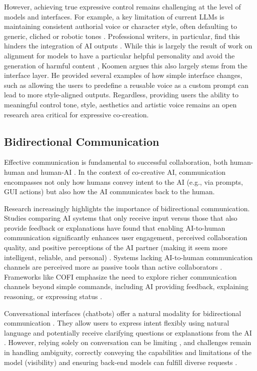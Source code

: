 However, achieving true expressive control remains challenging at the level of models and interfaces. For example, a key limitation of current LLMs is maintaining consistent authorial voice or character style, often defaulting to generic, cliched or robotic tones \cite{Ippolito2022-mf, Yuan2022-kb, Chakrabarty2024-ov}. Professional writers, in particular, find this hinders the integration of AI outputs \cite{Ippolito2022-mf, Grigis2024-pf}. While this is largely the result of work on alignment for models to have a particular helpful personality and avoid the generation of harmful content \cite{Anthropic2024-ne, Ouyang2022-af, Bai2022-ec}, Koomen \cite{Koomen2025-eu} argues this also largely stems from the interface layer. He provided several examples of how simple interface changes, such as allowing the users to predefine a reusable voice as a custom prompt can lead to more style-aligned outputs. Regardless, providing users the ability to meaningful control tone, style, aesthetics and artistic voice remains an open research area critical for expressive co-creation.

\subsection{Bidirectional Communication}

Effective communication is fundamental to successful collaboration, both human-human and human-AI \cite{Mamykina2002-lm, Rezwana2022-gg}. In the context of co-creative AI, communication encompasses not only how humans convey intent to the AI (e.g., via prompts, GUI actions) but also how the AI communicates back to the human.

Research increasingly highlights the importance of bidirectional communication. Studies comparing AI systems that only receive input versus those that also provide feedback or explanations have found that enabling AI-to-human communication significantly enhances user engagement, perceived collaboration quality, and positive perceptions of the AI partner (making it seem more intelligent, reliable, and personal) \cite{Rezwana2023-gj, Rezwana2022-ui}. Systems lacking AI-to-human communication channels are perceived more as passive tools than active collaborators \cite{Rezwana2023-gj}. Frameworks like COFI emphasize the need to explore richer communication channels beyond simple commands, including AI providing feedback, explaining reasoning, or expressing status \cite{Rezwana2022-gg}.

Conversational interfaces (chatbots) offer a natural modality for bidirectional communication \cite{Coenen2021-ym, Zhang2021-ej}. They allow users to express intent flexibly using natural language and potentially receive clarifying questions or explanations from the AI \cite{Coenen2021-ym}. However, relying solely on conversation can be limiting \cite{Tholander2023-rv}, and challenges remain in handling ambiguity, correctly conveying the capabilities and limitations of the model (visibility) and ensuring back-end models can fulfill diverse requests \cite{Zhang2021-ej}.

